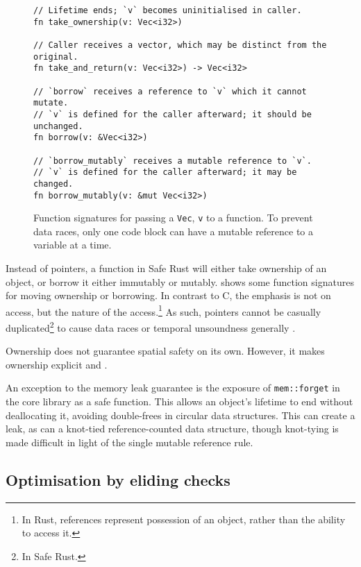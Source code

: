 \documentclass[dissertation.tex]{subfiles}
\begin{document}
\begin{figure}[ht]
\begin{lstlisting}
// Lifetime ends; `v` becomes uninitialised in caller.
fn take_ownership(v: Vec<i32>)

// Caller receives a vector, which may be distinct from the original.
fn take_and_return(v: Vec<i32>) -> Vec<i32>

// `borrow` receives a reference to `v` which it cannot mutate.
// `v` is defined for the caller afterward; it should be unchanged.
fn borrow(v: &Vec<i32>)

// `borrow_mutably` receives a mutable reference to `v`.
// `v` is defined for the caller afterward; it may be changed.
fn borrow_mutably(v: &mut Vec<i32>)
\end{lstlisting}
\caption{ Function signatures for passing a
\texttt{Vec}, \texttt{v} to a function. To prevent data races, only one
code block can have a mutable reference to a variable at a time.}
\label{lst:rust-ownership}
\end{figure}

Instead of pointers, a function in Safe Rust will either take ownership
of an object, or borrow it either immutably or mutably.
 shows some function signatures for
moving ownership or borrowing.
In contrast to C, the emphasis is not on access, but the nature of the
access.\footnote{In Rust, references represent possession of an object,
rather than the ability to access it.}
As such, pointers cannot be casually duplicated\footnote{In Safe Rust.}
to cause data races or temporal unsoundness generally .

Ownership does not guarantee spatial safety on its own.
However, it makes ownership explicit and .

An exception to the memory leak guarantee is the exposure of
\texttt{mem::forget} in the core library as a safe function.
This allows an object's lifetime to end without deallocating it,
avoiding double-frees in circular data structures.
This can create a leak, as can a knot-tied reference-counted data
structure, though knot-tying is made difficult in light of the single
mutable reference rule.


\subsection{Optimisation by eliding checks}
\label{sec:rust-elision}
\end{document}
